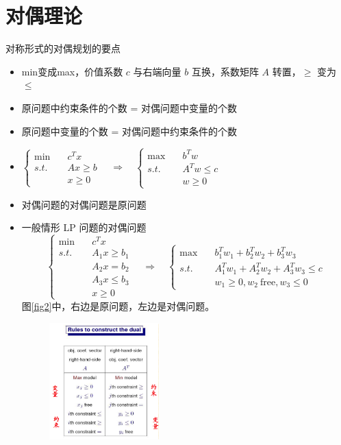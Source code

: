 \section{对偶理论}
\begin{remark}
    对称形式的对偶规划的要点
    \begin{itemize}
        \item min变成max，价值系数 $c$ 与右端向量 $b$ 互换，系数矩阵 $A$ 转置，$\ge$ 变为 $\le$
        \item 原问题中约束条件的个数 = 对偶问题中变量的个数
        \item 原问题中变量的个数 = 对偶问题中约束条件的个数
        \item $\begin{cases}
            \min \quad &c^Tx\\
            s.t. \quad &Ax \ge b\\
            & x \ge 0
        \end{cases}\quad  \Longrightarrow \quad \begin{cases}
            \max\quad &b^Tw \\
            s.t.\quad &A^Tw \le c\\
            &w \ge 0
        \end{cases}$
        \item 对偶问题的对偶问题是原问题
        \item 一般情形 LP 问题的对偶问题\[\begin{cases}
            \min \quad & c^Tx\\
            s.t. \quad & A_1x \ge b_1\\
            & A_2x = b_2\\
            &A_3x \le b_3\\
            &x \ge 0
        \end{cases} \quad \Longrightarrow \quad \begin{cases}
            \max \quad & b_1^Tw_1 + b_2^Tw_2 + b_3^Tw_3\\
            s.t. \quad & A_1^Tw_1 + A_2^Tw_2 + A_3^Tw_3 \le c\\
            &w_1 \ge 0, w_2\  \text{free}, w_3 \le 0
        \end{cases}\]
        图\ref{fig2}中，右边是原问题，左边是对偶问题。
        \begin{figure}[htbp]
            \centering
            \includegraphics[width=0.4\textwidth]{./figures/img2.png}

\end{figure}
\end{itemize}
\end{remark}

